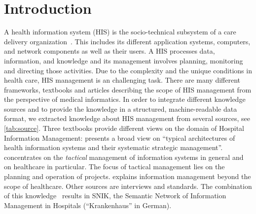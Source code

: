 \documentclass{IOS-Book-Article}     %
\newcommand{\citet}{\cite}%
\newcommand{\citep}{\cite}%
\begin{document}
\section{Introduction}
A health information system (HIS) is the socio-technical subsystem of a care delivery organization~\citep{bb}.
This includes its different application systems, computers, and network components as well as their users.
A HIS processes data, information, and knowledge and its management involves planning, monitoring and directing those activities.
Due to the complexity and the unique conditions in health care, HIS management is an challenging task.
There are many different frameworks, textbooks and articles describing the scope of HIS management from the perspective of medical informatics.
In order to integrate different knowledge sources and to provide the knowledge in a structured, machine-readable data format, we extracted knowledge about HIS management from several sources, see \cref{tab:source}.
Three textbooks provide different views on the domain of Hospital Information Management:
\citet{bb} presents a broad view on \enquote{typical architectures of health information systems and their systematic strategic management}.
\citep{ob} concentrates on the \emph{tactical} management of information systems in general and on healthcare in particular.
The focus of tactical management lies on the planning and operation of projects.
\citet{he} explains information management beyond the scope of healthcare.
Other sources are interviews and standards.
%
The combination of this knowledge~\citep{semantischesnetz,domaene,approachtosupport} results in SNIK, the Semantic Network of Information Management in Hospitals (\enquote{Krankenhaus} in German).
\end{document}

